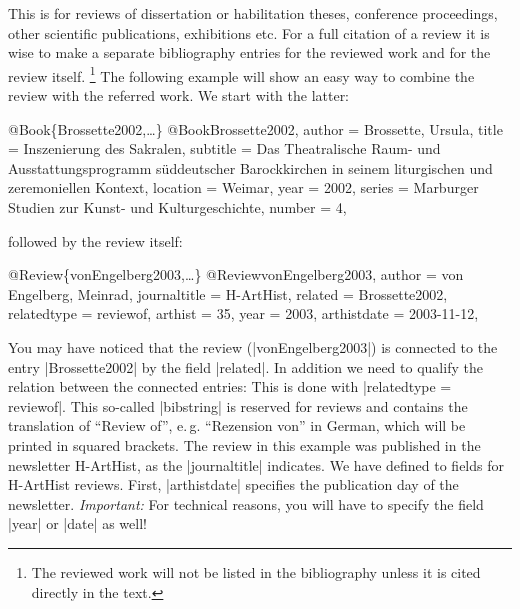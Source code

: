 \documentclass[a4paper,
10pt,
ngerman,
english
]{ltxdoc}
\begin{document}
This is for reviews of dissertation or habilitation theses, conference proceedings, other scientific publications, exhibitions etc.
For a full citation of a review it is wise to make a separate bibliography entries for the reviewed work and for the review itself.%
\footnote{The reviewed work will not be listed in the bibliography unless it is cited directly in the text.}
The following example will show an easy way to combine the review with the referred work.
We start with the latter:
\begin{bibexample}[label=Brossette2002]{{@}Book\{Brossette2002,…\}}
@Book{Brossette2002,
  author   = {Brossette, Ursula},
  title    = {Inszenierung des Sakralen},
  subtitle = {Das Theatralische Raum- und Ausstattungsprogramm süddeutscher Barockkirchen in seinem liturgischen und zeremoniellen Kontext},
  location = {Weimar},
  year     = {2002},
  series   = {Marburger Studien zur Kunst- und Kulturgeschichte},
  number   = {4},
}
\end{bibexample}
followed by the review itself:
\begin{bibexample}[label=vonEngelberg2003]{{@}Review\{vonEngelberg2003,…\}}
@Review{vonEngelberg2003,
  author       = {von Engelberg, Meinrad},
  journaltitle = {H-ArtHist},
  related      = {Brossette2002},
  relatedtype  = {reviewof},
  arthist      = {35},
  year         = {2003},
  arthistdate  = {2003-11-12},
}\end{bibexample}
You may have noticed that the review (|vonEngelberg2003|) is connected to the entry |Brossette2002| by the field |related|.
In addition we need to qualify the relation between the connected entries:
This is done with |relatedtype = {reviewof}|.
This so-called |bibstring| is reserved for reviews and contains the translation of \enquote{Review of}, e.\,g. \enquote{Rezension von} in German, which will be printed in squared brackets.
The review in this example was published in the newsletter H-ArtHist, as the |journaltitle| indicates. We have defined to fields for H-ArtHist reviews. First, |arthistdate| specifies the publication day of the newsletter. \emph{Important:} For technical reasons, you will have to specify the field |year| or |date| as well!
\end{document}
